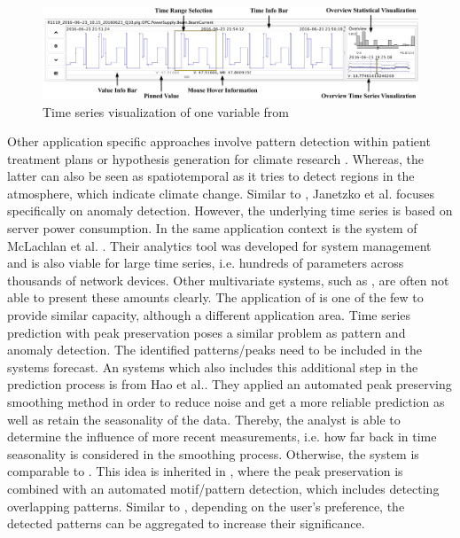 \documentclass[electronic]{vgtc}             %
\begin{document}
\begin{figure}[htb]
	\centering
	\includegraphics[width=\columnwidth]{Falcon}
	\caption{Time series visualization of one variable from \cite{steed:2017}
	}
	\label{fig:falcon}
\end{figure}

Other application specific approaches involve pattern detection within patient treatment plans \cite{Gschwandtner:2011} or hypothesis generation for climate research \cite{Kehrer:2008}.
Whereas, the latter can also be seen as spatiotemporal as it tries to detect regions in the atmosphere, which indicate climate change.
Similar to \cite{Xie:2014}, Janetzko et al. \cite{janetzko:2014} focuses specifically on anomaly detection.
However, the underlying time series is based on server power consumption.
In the same application context is the system of McLachlan et al. \cite{McLachlan:2008}. 
Their analytics tool was developed for system management and is also viable for large time series, i.e. hundreds of parameters across thousands of network devices.
Other multivariate systems, such as \cite{ichikawa:2002, buono:2005, buono:2007}, are often not able to present these amounts clearly.
The application of \cite{steed:2017} is one of the few to provide similar capacity, although a different application area. 
Time series prediction with peak preservation poses a similar problem as pattern and anomaly detection. 
The identified patterns/peaks need to be included in the systems forecast.
An systems which also includes this additional step in the prediction process is from Hao et al.\cite{Hao:2011, Hao:2009}.
They applied an automated peak preserving smoothing method in order to reduce noise and get a more reliable prediction as well as retain the seasonality of the data.
Thereby, the analyst is able to determine the influence of more recent measurements, i.e. how far back in time seasonality is considered in the smoothing process. 
Otherwise, the system is comparable to \cite{buono:2007}.
This idea is inherited in \cite{Hao:2012}, where the peak preservation is combined with an automated motif/pattern detection, which includes detecting overlapping patterns. 
Similar to \cite{buono:2007}, depending on the user's preference, the detected patterns can be aggregated to increase their significance.
\end{document}
